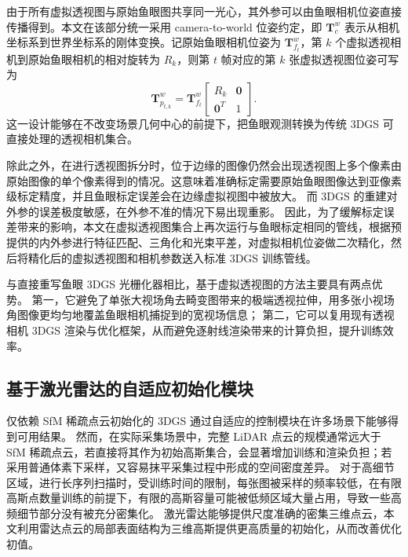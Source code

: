 由于所有虚拟透视图与原始鱼眼图共享同一光心，其外参可以由鱼眼相机位姿直接传播得到。本文在该部分统一采用 camera-to-world 位姿约定，即 \(\mathbf{T}_{c}^{w}\) 表示从相机坐标系到世界坐标系的刚体变换。记原始鱼眼相机位姿为 \(\mathbf{T}_{f_t}^{w}\)，第 \(k\) 个虚拟透视相机到原始鱼眼相机的相对旋转为 \(R_k\)，则第 \(t\) 帧对应的第 \(k\) 张虚拟透视图位姿可写为
\begin{equation}
    \label{equ:method-perspective-pose}
    \mathbf{T}_{p_{t,k}}^{w} = \mathbf{T}_{f_t}^{w}
    \left[
    \begin{array}{cc}
        R_k & \mathbf{0} \\
        \mathbf{0}^{T} & 1
    \end{array}
    \right].
\end{equation}
这一设计能够在不改变场景几何中心的前提下，把鱼眼观测转换为传统 3DGS 可直接处理的透视相机集合。

除此之外，在进行透视图拆分时，位于边缘的图像仍然会出现透视图上多个像素由原始图像的单个像素得到的情况。这意味着准确标定需要原始鱼眼图像达到亚像素级标定精度，并且鱼眼标定误差会在边缘虚拟视图中被放大。
而 3DGS 的重建对外参的误差极度敏感，在外参不准的情况下易出现重影。
因此，为了缓解标定误差带来的影响，本文在虚拟透视图集合上再次运行与鱼眼标定相同的管线，根据预提供的内外参进行特征匹配、三角化和光束平差，对虚拟相机位姿做二次精化，然后将精化后的虚拟透视图和相机参数送入标准 3DGS 训练管线。

与直接重写鱼眼 3DGS 光栅化器相比，基于虚拟透视图的方法主要具有两点优势。
第一，它避免了单张大视场角去畸变图带来的极端透视拉伸，用多张小视场角图像更均匀地覆盖鱼眼相机捕捉到的宽视场信息；
第二，它可以复用现有透视相机 3DGS 渲染与优化框架，从而避免逐射线渲染带来的计算负担，提升训练效率。

\subsection{基于激光雷达的自适应初始化模块}
\label{sec:method-lidar-mesh}

仅依赖 SfM 稀疏点云初始化的 3DGS 通过自适应的控制模块在许多场景下能够得到可用结果。
然而，在实际采集场景中，完整 LiDAR 点云的规模通常远大于 SfM 稀疏点云，若直接将其作为初始高斯集合，会显著增加训练和渲染负担；若采用普通体素下采样，又容易抹平采集过程中形成的空间密度差异。
对于高细节区域，进行长序列扫描时，受训练时间的限制，每张图被采样的频率较低，在有限高斯点数量训练的前提下，有限的高斯容量可能被低频区域大量占用，导致一些高频细节部分没有被充分密集化。
激光雷达能够提供尺度准确的密集三维点云，本文利用雷达点云的局部表面结构为三维高斯提供更高质量的初始化，从而改善优化初值。

